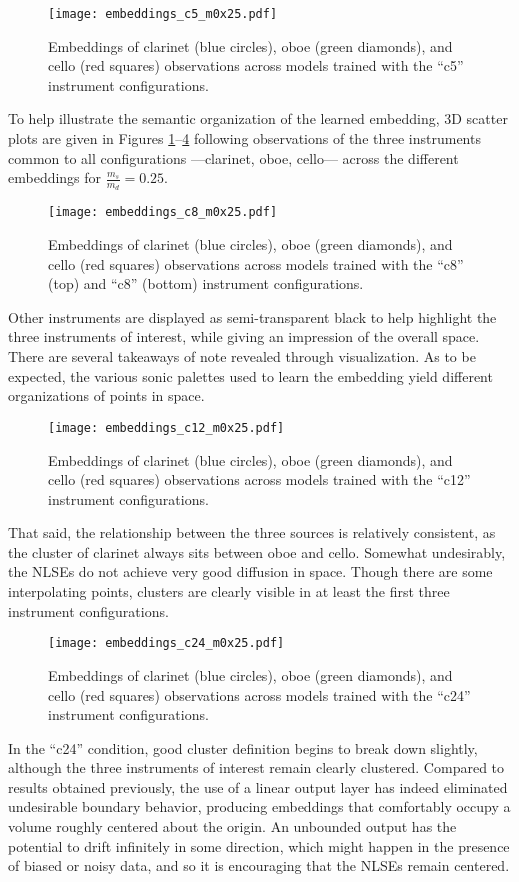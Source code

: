 \begin{figure}[t!]
\centering
\texttt{[image: embeddings\_c5\_m0x25.pdf]}
\caption{Embeddings of clarinet (blue circles), oboe (green diamonds), and cello (red squares) observations across models trained with the ``c5'' instrument configurations.}
\label{fig:embeddings_c5_m0x25}
\end{figure}

To help illustrate the semantic organization of the learned embedding, 3D scatter plots are given in Figures \ref{fig:embeddings_c5_m0x25}--\ref{fig:embeddings_c24_m0x25} following observations of the three instruments common to all configurations ---clarinet, oboe, cello--- across the different embeddings for $\frac{m_s}{m_d} = 0.25$.
\begin{figure}[t!]
\centering
\texttt{[image: embeddings\_c8\_m0x25.pdf]}
\caption{Embeddings of clarinet (blue circles), oboe (green diamonds), and cello (red squares) observations across models trained with the ``c8'' (top) and ``c8'' (bottom) instrument configurations.}
\label{fig:embeddings_c8_m0x25}
\end{figure}
Other instruments are displayed as semi-transparent black to help highlight the three instruments of interest, while giving an impression of the overall space.
There are several takeaways of note revealed through visualization.
As to be expected, the various sonic palettes used to learn the embedding yield different organizations of points in space.
\begin{figure}[t!]
\centering
\texttt{[image: embeddings\_c12\_m0x25.pdf]}
\caption{Embeddings of clarinet (blue circles), oboe (green diamonds), and cello (red squares) observations across models trained with the ``c12'' instrument configurations.}
\label{fig:embeddings_c12_m0x25}
\end{figure}
That said, the relationship between the three sources is relatively consistent, as the cluster of clarinet always sits between oboe and cello.
Somewhat undesirably, the NLSEs do not achieve very good diffusion in space.
Though there are some interpolating points, clusters are clearly visible in at least the first three instrument configurations.
\begin{figure}[t!]
\centering
\texttt{[image: embeddings\_c24\_m0x25.pdf]}
\caption{Embeddings of clarinet (blue circles), oboe (green diamonds), and cello (red squares) observations across models trained with the ``c24'' instrument configurations.}
\label{fig:embeddings_c24_m0x25}
\end{figure}
In the ``c24'' condition, good cluster definition begins to break down slightly, although the three instruments of interest remain clearly clustered.
Compared to results obtained previously, the use of a linear output layer has indeed eliminated undesirable boundary behavior, producing embeddings that comfortably occupy a volume roughly centered about the origin.
An unbounded output has the potential to drift infinitely in some direction, which might happen in the presence of biased or noisy data, and so it is encouraging that the NLSEs remain centered.

